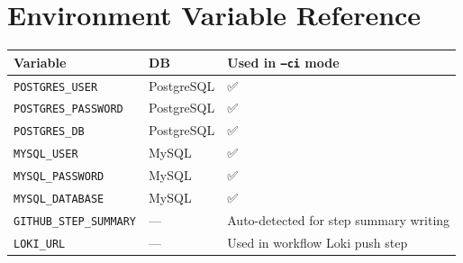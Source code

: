 \documentclass[12pt,a4paper]{report}
\begin{document}
\chapter{Environment Variable Reference}

\begin{center}
\begin{tabular}{@{}lll@{}}
\toprule
\textbf{Variable}        & \textbf{DB}   & \textbf{Used in \texttt{--ci} mode} \\
\midrule
\texttt{POSTGRES\_USER}     & PostgreSQL & ✅ \\
\texttt{POSTGRES\_PASSWORD} & PostgreSQL & ✅ \\
\texttt{POSTGRES\_DB}       & PostgreSQL & ✅ \\
\texttt{MYSQL\_USER}        & MySQL      & ✅ \\
\texttt{MYSQL\_PASSWORD}    & MySQL      & ✅ \\
\texttt{MYSQL\_DATABASE}    & MySQL      & ✅ \\
\texttt{GITHUB\_STEP\_SUMMARY} & — & Auto-detected for step summary writing \\
\texttt{LOKI\_URL}          & — & Used in workflow Loki push step \\
\bottomrule
\end{tabular}
\end{center}
\end{document}
